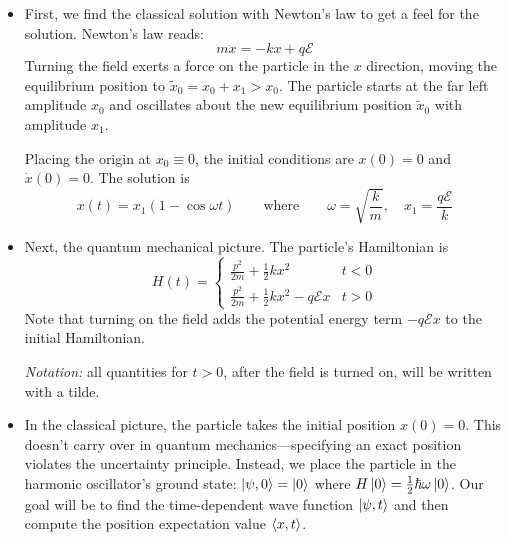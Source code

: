 \documentclass[11pt, a4paper]{article}
\newcommand{\eqtext}[1]{\qquad \text{#1} \qquad}
\begin{document}
\begin{itemize}
	\item First, we find the classical solution with Newton's law to get a feel for the solution. Newton's law reads:
	\begin{equation*}
		m\ddot{x} = -k x + q \mathcal{E}
	\end{equation*}
	Turning the field exerts a force on the particle in the $ x $ direction, moving the equilibrium position to $ \tilde{x}_{0} = x_{0} + x_{1} > x_{0} $. The particle starts at the far left amplitude $ x_{0} $ and oscillates about the new equilibrium position $ \tilde{x}_{0} $ with amplitude $ x_{1} $. 
	
	Placing the origin at $ x_{0} \equiv 0 $, the initial conditions are $ x(0) = 0 $ and $ \dot{x}(0) = 0 $. The solution is
	\begin{equation*}
		x(t) = x_{1}(1 - \cos \omega t) \eqtext{where} \omega = \sqrt{\frac{k}{m}}, \quad x_{1} = \frac{q\mathcal{E}}{k}
	\end{equation*}
	
	\item Next, the quantum mechanical picture. The particle's Hamiltonian is
	\begin{equation*}
	H(t) = 
		\begin{cases}
			\frac{p^{2}}{2m} + \frac{1}{2}kx^{2} & t < 0\\
			\frac{p^{2}}{2m} + \frac{1}{2}kx^{2} - q\mathcal{E}x & t > 0
		\end{cases}
	\end{equation*}
	Note that turning on the field adds the potential energy term $ - q\mathcal{E}x  $ to the initial Hamiltonian. 
	
	\textit{Notation:} all quantities for $ t > 0 $, after the field is turned on, will be written with a tilde. 
	
	\item In the classical picture, the particle takes the initial position $ x(0) = 0 $. This doesn't carry over in quantum mechanics---specifying an exact position violates the uncertainty principle. Instead, we place the particle in the harmonic oscillator's ground state: $ \ket{\psi, 0} = \ket{0} $ where $ H\ket{0} = \frac{1}{2}\hbar \omega \ket{0} $. Our goal will be to find the time-dependent wave function $ \ket{\psi, t} $ and then compute the position expectation value $ \ev{x, t} $. 
	

\end{itemize}
\end{document}
